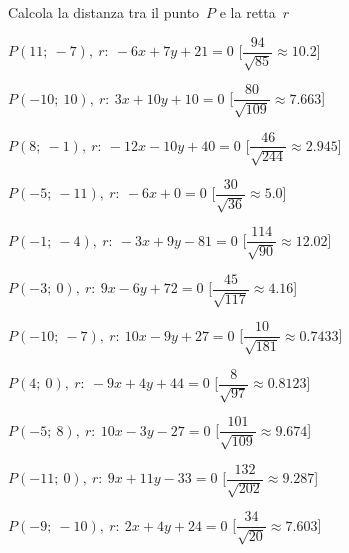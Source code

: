 \begin{esercizio}\label{ese:}
 Calcola la distanza tra il punto~$P$ e la retta~$r$
 \begin{enumeratea}
  \item  $P(11;~-7),~r:~-6 x + 7 y + 21 = 0$ \hfill 
   [$\dfrac{94}{\sqrt{85}}\approx  10.2$]
  \item  $P(-10;~10),~r:~3 x + 10 y + 10 = 0$ \hfill 
   [$\dfrac{80}{\sqrt{109}}\approx 7.663$]
  \item  $P(8;~-1),~r:~-12 x - 10 y + 40 = 0$ \hfill 
   [$\dfrac{46}{\sqrt{244}}\approx 2.945$]
  \item  $P(-5;~-11),~r:~-6 x + 0 = 0$ \hfill 
   [$\dfrac{30}{\sqrt{36}}\approx   5.0$]
  \item  $P(-1;~-4),~r:~-3 x + 9 y - 81 = 0$ \hfill 
   [$\dfrac{114}{\sqrt{90}}\approx 12.02$]
  \item  $P(-3;~0),~r:~9 x - 6 y + 72 = 0$ \hfill 
   [$\dfrac{45}{\sqrt{117}}\approx  4.16$]
  \item  $P(-10;~-7),~r:~10 x - 9 y + 27 = 0$ \hfill 
   [$\dfrac{10}{\sqrt{181}}\approx0.7433$]
  \item  $P(4;~0),~r:~-9 x + 4 y + 44 = 0$ \hfill 
   [$\dfrac{8}{\sqrt{97}}\approx0.8123$]
  \item  $P(-5;~8),~r:~10 x - 3 y - 27 = 0$ \hfill 
   [$\dfrac{101}{\sqrt{109}}\approx 9.674$]
  \item  $P(-11;~0),~r:~9 x + 11 y - 33 = 0$ \hfill 
   [$\dfrac{132}{\sqrt{202}}\approx 9.287$]
  \item  $P(-9;~-10),~r:~2 x + 4 y + 24 = 0$ \hfill 
   [$\dfrac{34}{\sqrt{20}}\approx 7.603$]
 \end{enumeratea}
\end{esercizio}


